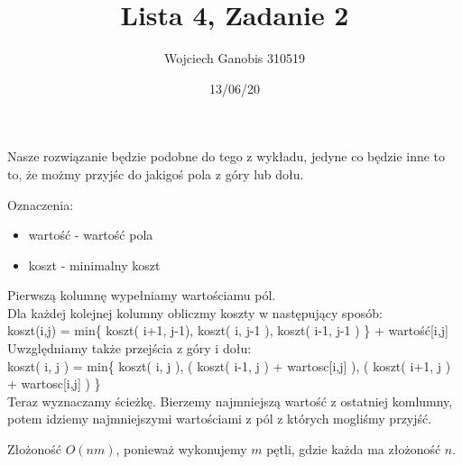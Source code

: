 \documentclass{article}
\title{Lista 4, Zadanie 2}
\author{Wojciech Ganobis 310519}
\date{13/06/20}
\newcommand\tab[1][1cm]{\hspace*{#1}}
\begin{document}
\maketitle
Nasze rozwiązanie będzie podobne do tego z wykładu, jedyne co będzie inne to to, że możmy przyjśc do jakigoś pola z góry lub dołu.

Oznaczenia:\\
\begin{itemize}
\item wartość - wartość pola
\item koszt - minimalny koszt
\end{itemize}
Pierwszą kolumnę wypełniamy wartościamu pól.\\
Dla każdej kolejnej kolumny obliczmy koszty w następujący sposób:\\
\tab koszt(i,j) = min\{ koszt( i+1, j-1), koszt( i, j-1 ), koszt( i-1, j-1 ) \} + wartość[i,j]\\
Uwzględniamy także przejścia z góry i dołu:\\
\tab koszt( i, j ) = min\{ koszt( i, j ), ( koszt( i-1, j ) + wartosc[i,j] ), ( koszt( i+1, j ) + wartosc[i,j] ) \}\\

Teraz wyznaczamy ścieżkę. Bierzemy najmniejszą wartość z ostatniej komlumny, potem idziemy najmniejszymi wartościami z pól z których mogliśmy przyjść.

Złożoność $O(nm)$, ponieważ wykonujemy $m$ pętli, gdzie każda ma złożoność $n$.
\end{document}
